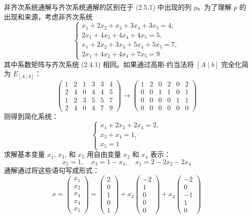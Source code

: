 非齐次系统通解与齐次系统通解的区别在于 (2.5.1) 中出现的列 \(p\)。为了理解 \(p\) 的出现和来源，考虑非齐次系统
\[
\begin{cases}
x_{1} + 2x_{2} + x_{3} + 3x_{4} + 3x_{5} = 4, \\
2x_{1} + 4x_{2} + 4x_{4} + 4x_{5} = 5, \\
x_{1} + 2x_{2} + 3x_{3} + 5x_{4} + 5x_{5} = 7, \\
2x_{1} + 4x_{2} + 4x_{4} + 7x_{5} = 9
\end{cases}
\]
其中系数矩阵与齐次系统 (2.4.1) 相同。如果通过高斯-约当法将 \([A \mid b]\) 完全化简为 \(E_{[A \mid b]}\)：
\[
\begin{pmatrix}
1 & 2 & 1 & 3 & 3 & 4 \\
2 & 4 & 0 & 4 & 4 & 5 \\
1 & 2 & 3 & 5 & 5 & 7 \\
2 & 4 & 0 & 4 & 7 & 9
\end{pmatrix}
\rightarrow
\begin{pmatrix}
1 & 2 & 0 & 2 & 0 & 2 \\
0 & 0 & 1 & 1 & 0 & 1 \\
0 & 0 & 0 & 0 & 1 & 1 \\
0 & 0 & 0 & 0 & 0 & 0
\end{pmatrix}
\]
则得到简化系统：
\[
\begin{cases}
x_{1} + 2x_{2} + 2x_{4} = 2, \\
x_{3} + x_{4} = 1, \\
x_{5} = 1
\end{cases}
\]
求解基本变量 \(x_{1}\), \(x_{3}\), 和 \(x_{5}\) 用自由变量 \(x_{2}\) 和 \(x_{4}\) 表示：
\[
x_{5} = 1, \quad x_{3} = 1 - x_{4}, \quad x_{1} = 2 - 2x_{2} - 2x_{4}
\]
通解通过将这些语句写成形式：
\[
x = \begin{pmatrix} x_{1} \\ x_{2} \\ x_{3} \\ x_{4} \\ x_{5} \end{pmatrix} =
\begin{pmatrix} 2 \\ 0 \\ 1 \\ 0 \\ 1 \end{pmatrix} +
x_{2} \begin{pmatrix} -2 \\ 1 \\ 0 \\ 0 \\ 0 \end{pmatrix} +
x_{4} \begin{pmatrix} -2 \\ 0 \\ -1 \\ 1 \\ 0 \end{pmatrix}
\]
